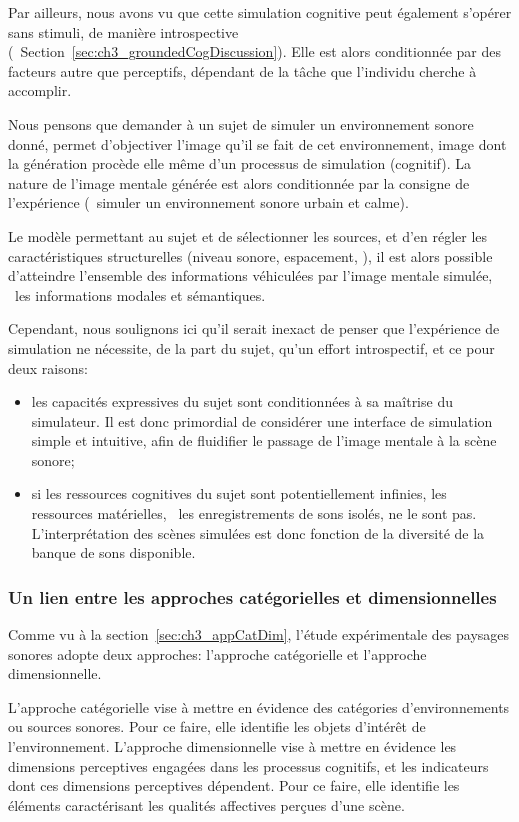 Par ailleurs, nous avons vu que cette simulation cognitive peut également s'opérer sans stimuli, de manière introspective (\cf~Section~\ref{sec:ch3_groundedCogDiscussion}). Elle est alors conditionnée par des facteurs autre que perceptifs, dépendant de la tâche que l'individu cherche à accomplir.

Nous pensons que demander à un sujet de simuler un environnement sonore donné, permet d'objectiver l'image qu'il se fait de cet environnement, image dont la génération procède elle même d'un processus de simulation (cognitif). La nature de l'image mentale générée est alors conditionnée par la consigne de l'expérience (\eg~simuler un environnement sonore urbain et calme).

Le modèle permettant au sujet et de sélectionner les sources, et d'en régler les caractéristiques structurelles (niveau sonore, espacement, \etc), il est alors possible d'atteindre l'ensemble des informations véhiculées par l'image mentale simulée, \ie~les informations modales et sémantiques.

Cependant, nous soulignons ici qu'il serait inexact de penser que l'expérience de simulation ne nécessite, de la part du sujet, qu'un effort introspectif, et ce pour deux raisons:

\begin{itemize}
\item les capacités expressives du sujet sont conditionnées à sa maîtrise du simulateur. Il est donc primordial de considérer une interface de simulation simple et intuitive, afin de fluidifier le passage de l'image mentale à la scène sonore;
\item si les ressources cognitives du sujet sont potentiellement infinies, les ressources matérielles, \ie~les enregistrements de sons isolés, ne le sont pas. L'interprétation des scènes simulées est donc fonction de la diversité de la banque de sons disponible. 
\end{itemize}

\subsubsection{Un lien entre les approches catégorielles et dimensionnelles}

Comme vu à la section~\ref{sec:ch3_appCatDim}, l'étude expérimentale des paysages sonores adopte deux approches: l'approche catégorielle et l'approche dimensionnelle.

L'approche catégorielle vise à mettre en évidence des catégories d'environnements ou sources sonores. Pour ce faire, elle identifie les objets d'intérêt de l'environnement. L'approche dimensionnelle vise à mettre en évidence les dimensions perceptives engagées dans les processus cognitifs, et les indicateurs dont ces dimensions perceptives dépendent. Pour ce faire, elle identifie les éléments caractérisant les qualités affectives perçues d'une scène.

